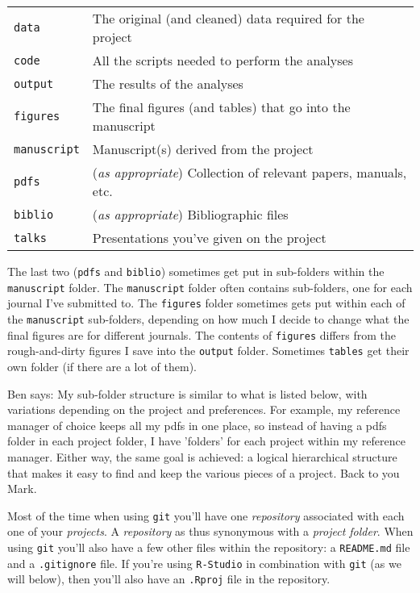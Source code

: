 \documentclass[12pt,letterpaper]{article}
\begin{document}
\begin{tabular}{ll}
 \texttt{data} & The original (and cleaned) data required for the project\\
 \texttt{code} & All the scripts needed to perform the analyses \\
 \texttt{output} & The results of the analyses \\
 \texttt{figures} & The final figures (and tables) that go into the manuscript\\
 \texttt{manuscript} & Manuscript(s) derived from the project\\
 \texttt{pdfs} & (\emph{as appropriate}) Collection of relevant papers, manuals, etc.\\
 \texttt{biblio} & (\emph{as appropriate}) Bibliographic files\\
 \texttt{talks} & Presentations you've given on the project\\
\end{tabular}

The last two (\texttt{pdfs} and \texttt{biblio}) sometimes get put in sub-folders within the \texttt{manuscript} folder.  The  \texttt{manuscript} folder often contains sub-folders, one for each journal I've submitted to.  The \texttt{figures} folder sometimes gets put within each of the  \texttt{manuscript} sub-folders, depending on how much I decide to change what the final figures are for different journals.  The contents of \texttt{figures} differs from the rough-and-dirty figures I save into the \texttt{output} folder.  Sometimes \texttt{tables} get their own folder (if there are a lot of them).

Ben says: My sub-folder structure is similar to what is listed below, with variations depending on the project and preferences. For example, my reference manager of choice keeps all my pdfs in one place, so instead of having a pdfs folder in each project folder, I have 'folders' for each project within my reference manager. Either way, the same goal is achieved: a logical hierarchical structure that makes it easy to find and keep the various pieces of a project. Back to you Mark.

Most of the time when using \texttt{git} you'll have one \emph{repository} associated with each one of your \emph{projects}.  A \emph{repository} as thus synonymous with a \emph{project folder}.  When using \texttt{git} you'll also have a few other files within the repository: a \texttt{README.md} file and a \texttt{.gitignore} file.  If you're using \texttt{R-Studio} in combination with \texttt{git} (as we will below), then you'll also have an \texttt{.Rproj} file in the repository.
\end{document}
